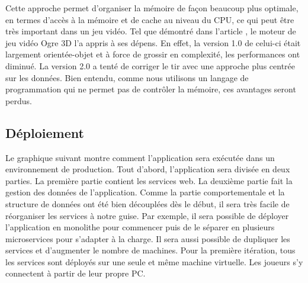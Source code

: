 \documentclass[12pt]{article}
\begin{document}


Cette approche permet d'organiser la mémoire de façon beaucoup plus optimale, en termes d'accès à la mémoire et de cache au niveau du CPU, ce qui peut être très important dans un jeu vidéo. Tel que démontré dans l'article \cite{DOD_Game_Engine}, le moteur de jeu vidéo Ogre 3D l'a appris à ses dépens. En effet, la version 1.0 de celui-ci était largement orientée-objet et à force de grossir en complexité, les performances ont diminué. La version 2.0 a tenté de corriger le tir avec une approche plus centrée sur les données. Bien entendu, comme nous utilisons un langage de programmation qui ne permet pas de contrôler la mémoire, ces avantages seront perdus.


\subsection{Déploiement}

Le graphique suivant montre comment l'application sera exécutée dans un environnement de production. Tout d'abord, l'application sera divisée en deux parties. La première partie contient les services web. La deuxième partie fait la gestion des données de l'application. Comme la partie comportementale et la structure de données ont été bien découplées dès le début, il sera très facile de réorganiser les services à notre guise. Par exemple, il sera possible de déployer l'application en monolithe pour commencer puis de le séparer en plusieurs microservices pour s'adapter à la charge. Il sera aussi possible de dupliquer les services et d'augmenter le nombre de machines. Pour la première itération, tous les services sont déployés sur une seule et même machine virtuelle. Les joueurs s'y connectent à partir de leur propre PC.
\end{document}
